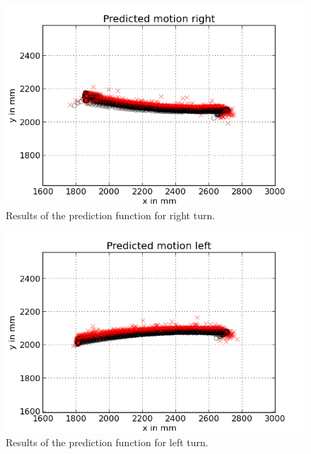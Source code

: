\documentclass{scrartcl}
\begin{document}
\begin{figure}[H]
\centering
\begin{minipage}{.5\textwidth}
  \centering
  \includegraphics[width=1\linewidth]{img/predictright.png}
\end{minipage}%

\caption{Results of the prediction function for right turn. }
\label{fig:prediction}
\end{figure}

\begin{figure}[H]
\centering
\begin{minipage}{.5\textwidth}
  \centering
  \includegraphics[width=1\linewidth]{img/predictleft.png}
\end{minipage}%

\caption{Results of the prediction function for left turn.}
\label{fig:prediction}
\end{figure}
\end{document}
